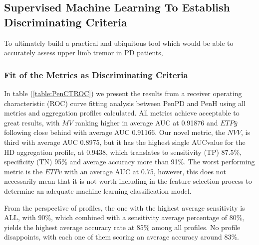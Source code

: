 \subsection{Supervised Machine Learning To Establish Discriminating Criteria}
\label{subsec:PenCTML}
To ultimately build a practical and ubiquitous tool which would be able to accurately assess upper limb tremor in \gls{PD} patients, 

\subsubsection{Fit of the Metrics as Discriminating Criteria}
\label{subsubsec:PenCTMetricsFit}
In table (\ref{table:PenCTROC}) we present the results from a receiver operating characteristic (\gls{ROC}) curve fitting analysis between \gls{PenPD} and \gls{PenH} using all metrics and aggregation profiles calculated. All metrics achieve acceptable to great results, with $MV$ ranking higher in average \gls{AUC} at 0.91876 and $ETP\bar{y}$ following close behind with average \gls{AUC} 0.91166. Our novel metric, the $NVV$, is third with average \gls{AUC} 0.8975, but it has the highest single \gls{AUC}value for the HD aggregation profile, at 0.9438, which translates to sensitivity (\gls{TP}) 87.5\%, specificity (\gls{TN}) 95\% and average accuracy more than 91\%. The worst performing metric is the $ETPv$ with an average \gls{AUC} at 0.75, however, this does not necessarily mean that it is not worth including in the feature selection process to determine an adequate machine learning classification model. 

From the perspective of profiles, the one with the highest average sensitivity is ALL, with 90\%, which combined with a sensitivity average percentage of 80\%, yields the highest average accuracy rate at 85\% among all profiles. No profile disappoints, with each one of them scoring an average accuracy around 83\%.

